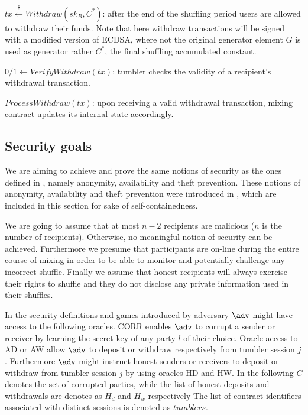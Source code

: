 \documentclass[a4paper]{article}
\theoremstyle{definition}
\begin{document}
$tx\stackrel{\$}{\leftarrow}Withdraw(sk_B, C^{*})$: after the end of the shuffling period users are allowed to withdraw their funds. Note that here withdraw transactions will be signed with a modified version of ECDSA, where not the original generator element $G$ is used as generator rather $C^{*}$, the final shuffling accumulated constant.

$0/1\leftarrow VerifyWithdraw(tx)$: tumbler checks the validity of a recipient's withdrawal transaction.

$ProcessWithdraw(tx)$: upon receiving a valid withdrawal transaction, mixing contract updates its internal state accordingly.

\subsection{Security goals} \label{securitygoals}
We are aiming to achieve and prove the same notions of security as the ones defined in \cite{meiklejohn2018mobius}, namely anonymity, availability and theft prevention. These notions of anonymity, availability and theft prevention were introduced in \cite{meiklejohn2018mobius}, which are included in this section for sake of self-containedness.

We are going to assume that at most $n-2$ recipients are malicious ($n$ is the number of recipients). Otherwise, no meaningful notion of security can be achieved. Furthermore we presume that participants are on-line during the entire course of mixing in order to be able to monitor and potentially challenge any incorrect shuffle. Finally we assume that honest recipients will always exercise their rights to shuffle and they do not disclose any private information used in their shuffles.

In the security definitions and games introduced by \cite{meiklejohn2018mobius} adversary $\adv$ might have access to the following oracles. CORR enables $\adv$ to corrupt a sender or receiver by learning the secret key of any party $l$ of their choice. Oracle access to AD or AW allow $\adv$ to deposit or withdraw respectively from tumbler session $j$. Furthermore $\adv$ might instruct honest senders or receivers to deposit or withdraw from tumbler session $j$ by using oracles HD and HW. In the following $C$ denotes the set of corrupted parties, while the list of honest deposits and withdrawals are denotes as $H_{d}$ and $H_{w}$ respectively The list of contract identifiers associated with distinct sessions is denoted as $tumblers$.     
\end{document}
